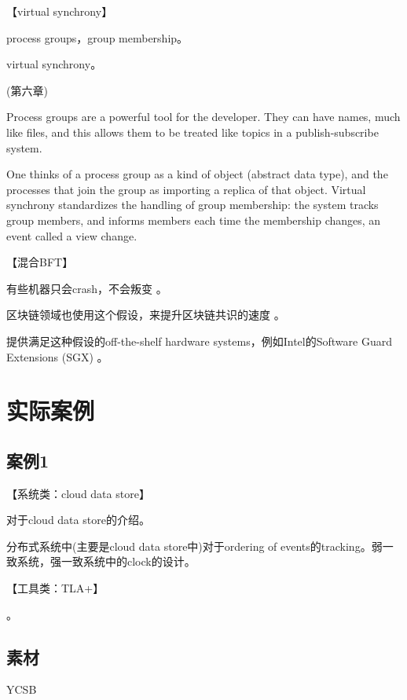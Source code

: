 \documentclass[UTF8]{ctexrep}
\newcommand{\mybreak}{\vspace{1cm}}
\begin{document}
【virtual synchrony】

process groups，group membership。

virtual synchrony。

\cite{Bost10} (第六章)

Process groups are a powerful tool for the developer. They can have names, much like files, and this allows them to be treated like topics in a publish-subscribe system. 

One thinks of a process group as a kind of object (abstract data type), and the processes that join the group as importing a replica of that object. Virtual synchrony standardizes the handling of group membership: the system tracks group members, and informs members each time the membership changes, an event called a view change.

\mybreak

【混合BFT】

有些机器只会crash，不会叛变 \cite{Vukotic19}。

区块链领域也使用这个假设，来提升区块链共识的速度 \cite{Dang19}。

提供满足这种假设的off-the-shelf hardware systems，例如Intel的Software Guard Extensions (SGX) \cite{McKeen13}。


\part{实际案例}


\chapter{案例1}

【系统类：cloud data store】

\cite{Bravo15}

对于cloud data store的介绍。

分布式系统中(主要是cloud data store中)对于ordering of events的tracking。弱一致系统，强一致系统中的clock的设计。


\mybreak

【工具类：TLA+】


\cite{TLA-Github}。



\chapter*{素材}


YCSB \cite{Cooper10, YCSB-Github}













%
%




\end{document}
